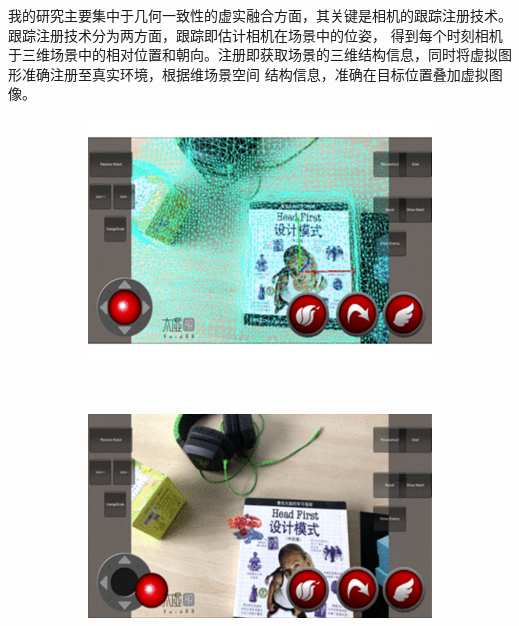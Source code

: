 我的研究主要集中于几何一致性的虚实融合方面，其关键是相机的跟踪注册技术。跟踪注册技术分为两方面，跟踪即估计相机在场景中的位姿，
得到每个时刻相机于三维场景中的相对位置和朝向。注册即获取场景的三维结构信息，同时将虚拟图形准确注册至真实环境，根据维场景空间
结构信息，准确在目标位置叠加虚拟图像。
\begin{figure}[!htbp]
    \centering
    \begin{subfigure}[b]{0.45\textwidth}
      \includegraphics[width=\textwidth]{Img/1-senceUnderstand.jpg}
      \caption{}
      \label{fig:senceUnderstand}
    \end{subfigure}%
    ~%
    \begin{subfigure}[b]{0.45\textwidth}
      \includegraphics[width=\textwidth]{Img/1-senceUnderstandAR.png}
      \caption{}
      \label{fig:senceUnderstandAR}
    \end{subfigure}
    \label{fig:scene}
\end{figure}

